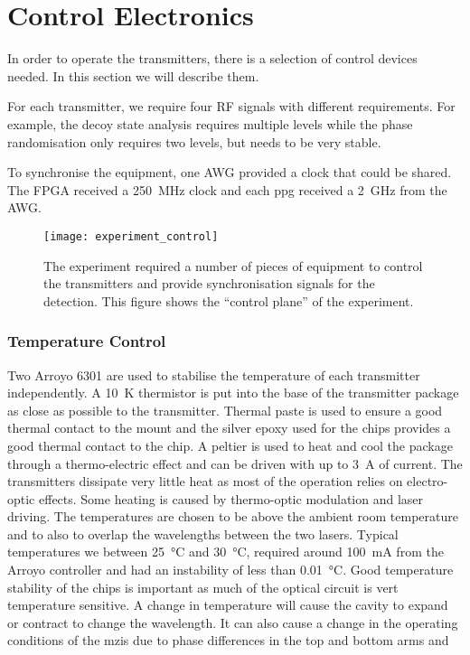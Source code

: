 \section{Control Electronics}

In order to operate the transmitters, there is a selection of control devices needed. In this section we will describe them.

For each transmitter, we require four RF signals with different requirements. For example, the decoy state analysis requires multiple levels while the phase randomisation only requires two levels, but needs to be very stable.

To synchronise the equipment, one AWG provided a clock that could be shared. The FPGA received a \SI{250}{\MHz} clock and each \ac{ppg} received a \SI{2}{\GHz} from the AWG. 

\begin{figure}[tbp]
	\centering
	\texttt{[image: experiment\_control]}
	\caption[Control electronic schematic of the MDI-QKD experiment]{The experiment required a number of pieces of equipment to control the transmitters and provide synchronisation signals for the detection. This figure shows the ``control plane'' of the experiment.}
	\label{fig04:exp_control}
\end{figure}

\subsubsection*{Temperature Control}

Two Arroyo 6301 are used to stabilise the temperature of each transmitter independently. A \SI{10}{K} thermistor is put into the base of the transmitter package as close as possible to the transmitter. Thermal paste is used to ensure a good thermal contact to the mount and the silver epoxy used for the chips provides a good thermal contact to the chip. A peltier is used to heat and cool the package through a thermo-electric effect and can be driven with up to \SI{3}{A} of current. The transmitters dissipate very little heat as most of the operation relies on electro-optic effects. Some heating is caused by thermo-optic modulation and laser driving. The temperatures are chosen to be above the ambient room temperature and to also to overlap the wavelengths between the two lasers. Typical temperatures we between \SI{25}{\celsius} and \SI{30}{\celsius}, required around \SI{100}{mA} from the Arroyo controller and had an instability of less than \SI{0.01}{\celsius}. Good temperature stability of the chips is important as much of the optical circuit is vert temperature sensitive. A change in temperature will cause the cavity to expand or contract to change the wavelength. It can also cause a change in the operating conditions of the \acp{mzi} due to phase differences in the top and bottom arms and  

